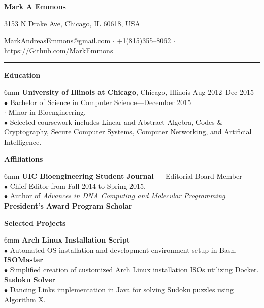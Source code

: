 \documentclass[11pt]{article}
\newcommand{\sectionheader}[1]{\noindent \textbf{\large #1}}
\newenvironment{sectionbody}{\begin{adjustwidth}{6mm}{}}{\end{adjustwidth}}
\begin{document}

\centerline{\LARGE \bf Mark A Emmons}
\centerline{3153 N Drake Ave, Chicago, IL 60618, USA}
\centerline{MarkAndreasEmmons@gmail.com $\cdot$ +1(815)355--8062 $\cdot$ https://Github.com/MarkEmmons}

\noindent\rule{16.5cm}{0.4pt}

\sectionheader{Education}
\begin{sectionbody}
{\bf University of Illinois at Chicago}, Chicago, Illinois \hfill Aug 2012--Dec 2015 \\
$\bullet$ Bachelor of Science in Computer Science---December 2015 \\
\indent $\cdot$ Minor in Bioengineering. \\
$\bullet$ Selected coursework includes Linear and Abstract Algebra, Codes \& Cryptography, Secure Computer Systems, Computer Networking, and Artificial Intelligence.
\end{sectionbody}

\vspace{2mm}

\sectionheader{Affiliations}
\begin{sectionbody}
{\bf UIC Bioengineering Student Journal} --- Editorial Board Member \\
$\bullet$ Chief Editor from Fall 2014 to Spring 2015. \\
$\bullet$ Author of {\it Advances in DNA Computing and Molecular Programming}. \\
{\bf President's Award Program Scholar}
\end{sectionbody}

\vspace{2mm}

\sectionheader{Selected Projects}
\begin{sectionbody}
{\bf Arch Linux Installation Script} \\
$\bullet$ Automated OS installation and development environment setup in Bash. \\
{\bf ISOMaster} \\
$\bullet$ Simplified creation of customized Arch Linux installation ISOs utilizing Docker. \\
{\bf Sudoku Solver} \\
$\bullet$ Dancing Links implementation in Java for solving Sudoku puzzles using Algorithm X.
\end{sectionbody}
\end{document}

